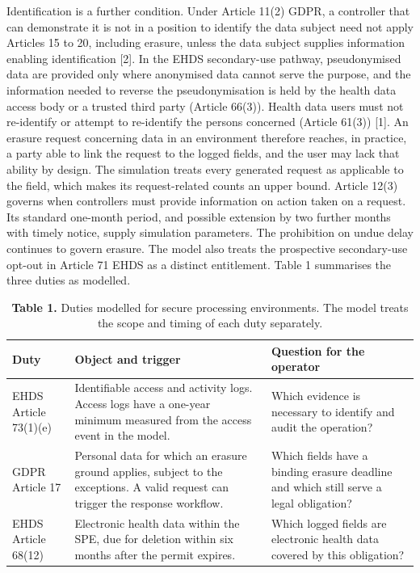 \documentclass[preprint,review,12pt]{elsarticle}
\begin{document}
Identification is a further condition. Under Article 11(2) GDPR, a
controller that can demonstrate it is not in a position to identify the
data subject need not apply Articles 15 to 20, including erasure, unless
the data subject supplies information enabling identification {[}2{]}.
In the EHDS secondary-use pathway, pseudonymised data are provided only
where anonymised data cannot serve the purpose, and the information
needed to reverse the pseudonymisation is held by the health data access
body or a trusted third party (Article 66(3)). Health data users must
not re-identify or attempt to re-identify the persons concerned (Article
61(3)) {[}1{]}. An erasure request concerning data in an environment
therefore reaches, in practice, a party able to link the request to the
logged fields, and the user may lack that ability by design. The
simulation treats every generated request as applicable to the field,
which makes its request-related counts an upper bound. Article 12(3)
governs when controllers must provide information on action taken on a
request. Its standard one-month period, and possible extension by two
further months with timely notice, supply simulation parameters. The
prohibition on undue delay continues to govern erasure. The model also
treats the prospective secondary-use opt-out in Article 71 EHDS as a
distinct entitlement. Table 1 summarises the three duties as modelled.

\begin{table}[!tbp]
\captionsetup{justification=raggedright,singlelinecheck=false}
\caption*{\textbf{Table 1.} Duties modelled for secure processing environments.
The model treats the scope and timing of each duty separately.}
\small
\begin{tabularx}{\textwidth}{>{\raggedright\arraybackslash}X>{\raggedright\arraybackslash}X>{\raggedright\arraybackslash}X}
\toprule
\textbf{Duty} & \textbf{Object and trigger} & \textbf{Question for the operator} \\
\midrule
EHDS Article 73(1)(e) & Identifiable access and activity logs. Access logs have a one-year minimum measured from the access event in the model. & Which evidence is necessary to identify and audit the operation? \\
GDPR Article 17 & Personal data for which an erasure ground applies, subject to the exceptions. A valid request can trigger the response workflow. & Which fields have a binding erasure deadline and which still serve a legal obligation? \\
EHDS Article 68(12) & Electronic health data within the SPE, due for deletion within six months after the permit expires. & Which logged fields are electronic health data covered by this obligation? \\
\bottomrule
\end{tabularx}
\end{table}
\end{document}
